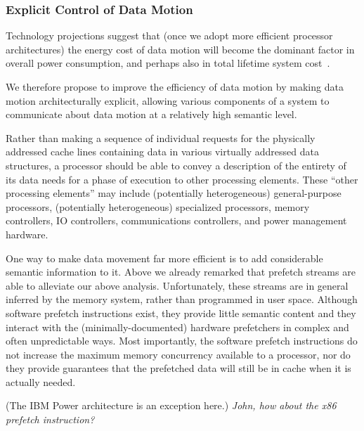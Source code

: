 
\subsubsection{Explicit Control of Data Motion}


Technology projections suggest that (once we adopt more efficient 
processor architectures) the energy cost of data motion will become 
the dominant factor in overall power consumption, and perhaps
also in total lifetime system cost~\cite{ExascaleTechnologyReport_2008}.

We therefore propose to improve the efficiency of data motion by making
data motion architecturally explicit, allowing various components of
a system to communicate about data motion at a relatively high
semantic level.  

Rather than making a sequence of individual requests
for the physically addressed cache lines containing data in various virtually
addressed data structures, a processor should be able to convey a 
description of the entirety of its data needs for a phase of execution to
other processing elements.   These ``other processing elements'' may 
include (potentially heterogeneous) general-purpose processors,
(potentially heterogeneous) specialized processors, memory controllers, 
IO controllers, communications controllers, and power management hardware.


One way to make data movement far more efficient
is to add considerable semantic information to it.
Above we already remarked that prefetch streams
are able to alleviate our above analysis. Unfortunately,
these streams are in general inferred by the memory
system, rather than programmed in user space. 
Although software prefetch instructions exist, they provide 
little semantic content and they interact with the (minimally-documented)
hardware prefetchers in complex and often unpredictable 
ways.  Most importantly, the software prefetch instructions
do not increase the maximum memory concurrency available 
to a processor, nor do they provide guarantees that the 
prefetched data will still be in cache when it is actually needed.

(The IBM Power architecture is an exception here.)
\textit{John, how about the x86 prefetch instruction?}

